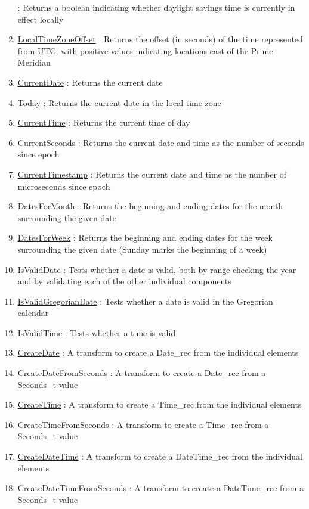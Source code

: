 \begin{enumerate}
: Returns a boolean indicating whether daylight savings time is currently in effect locally
\item \hyperlink{ecldoc:date.localtimezoneoffset}{LocalTimeZoneOffset}
: Returns the offset (in seconds) of the time represented from UTC, with positive values indicating locations east of the Prime Meridian
\item \hyperlink{ecldoc:date.currentdate}{CurrentDate}
: Returns the current date
\item \hyperlink{ecldoc:date.today}{Today}
: Returns the current date in the local time zone
\item \hyperlink{ecldoc:date.currenttime}{CurrentTime}
: Returns the current time of day
\item \hyperlink{ecldoc:date.currentseconds}{CurrentSeconds}
: Returns the current date and time as the number of seconds since epoch
\item \hyperlink{ecldoc:date.currenttimestamp}{CurrentTimestamp}
: Returns the current date and time as the number of microseconds since epoch
\item \hyperlink{ecldoc:date.datesformonth}{DatesForMonth}
: Returns the beginning and ending dates for the month surrounding the given date
\item \hyperlink{ecldoc:date.datesforweek}{DatesForWeek}
: Returns the beginning and ending dates for the week surrounding the given date (Sunday marks the beginning of a week)
\item \hyperlink{ecldoc:date.isvaliddate}{IsValidDate}
: Tests whether a date is valid, both by range-checking the year and by validating each of the other individual components
\item \hyperlink{ecldoc:date.isvalidgregoriandate}{IsValidGregorianDate}
: Tests whether a date is valid in the Gregorian calendar
\item \hyperlink{ecldoc:date.isvalidtime}{IsValidTime}
: Tests whether a time is valid
\item \hyperlink{ecldoc:date.createdate}{CreateDate}
: A transform to create a Date\_rec from the individual elements
\item \hyperlink{ecldoc:date.createdatefromseconds}{CreateDateFromSeconds}
: A transform to create a Date\_rec from a Seconds\_t value
\item \hyperlink{ecldoc:date.createtime}{CreateTime}
: A transform to create a Time\_rec from the individual elements
\item \hyperlink{ecldoc:date.createtimefromseconds}{CreateTimeFromSeconds}
: A transform to create a Time\_rec from a Seconds\_t value
\item \hyperlink{ecldoc:date.createdatetime}{CreateDateTime}
: A transform to create a DateTime\_rec from the individual elements
\item \hyperlink{ecldoc:date.createdatetimefromseconds}{CreateDateTimeFromSeconds}
: A transform to create a DateTime\_rec from a Seconds\_t value
\end{enumerate}

